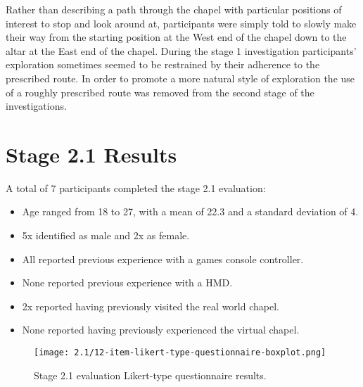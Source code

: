 Rather than describing a path through the chapel with particular positions of interest to stop and look around at, participants were simply told to slowly make their way from the starting position at the West end of the chapel down to the altar at the East end of the chapel. During the stage 1 investigation participants' exploration sometimes seemed to be restrained by their adherence to the prescribed route. In order to promote a more natural style of exploration the use of a roughly prescribed route was removed from the second stage of the investigations.


\section{Stage 2.1 Results}

A total of 7 participants completed the stage 2.1 evaluation:
\begin{itemize}
	\item Age ranged from 18 to 27, with a mean of 22.3 and a standard deviation of 4.
	\item 5x identified as male and 2x as female.
	\item All reported previous experience with a games console controller.
	\item None reported previous experience with a HMD.
	\item 2x reported having previously visited the real world chapel.
	\item None reported having previously experienced the virtual chapel.
\end{itemize}


\begin{figure}
	\begin{center}
	\texttt{[image: 2.1/12-item-likert-type-questionnaire-boxplot.png]}
	\caption{Stage 2.1 evaluation Likert-type questionnaire results.}
	\label{2-1-12-item-likert-type-questionnaire-boxplot.png}
	\end{center}
\end{figure}


